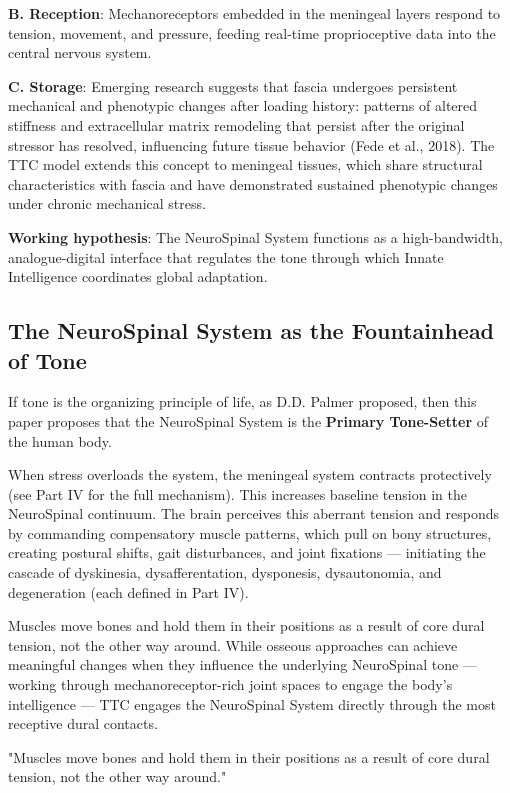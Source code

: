 \documentclass[11pt,letterpaper]{article}
\begin{document}
\textbf{B. Reception}: Mechanoreceptors embedded in the meningeal layers respond to tension, movement, and pressure, feeding real-time proprioceptive data into the central nervous system.


\textbf{C. Storage}: Emerging research suggests that fascia undergoes persistent mechanical and phenotypic changes after loading history: patterns of altered stiffness and extracellular matrix remodeling that persist after the original stressor has resolved, influencing future tissue behavior (Fede et al., 2018). The TTC model extends this concept to meningeal tissues, which share structural characteristics with fascia and have demonstrated sustained phenotypic changes under chronic mechanical stress.


\textbf{Working hypothesis}: The NeuroSpinal System functions as a high-bandwidth, analogue-digital interface that regulates the tone through which Innate Intelligence coordinates global adaptation.


\subsection{The NeuroSpinal System as the Fountainhead of Tone}

If tone is the organizing principle of life, as D.D. Palmer proposed, then this paper proposes that the NeuroSpinal System is the \textbf{Primary Tone-Setter} of the human body.


When stress overloads the system, the meningeal system contracts protectively (see Part IV for the full mechanism). This increases baseline tension in the NeuroSpinal continuum. The brain perceives this aberrant tension and responds by commanding compensatory muscle patterns, which pull on bony structures, creating postural shifts, gait disturbances, and joint fixations — initiating the cascade of dyskinesia, dysafferentation, dysponesis, dysautonomia, and degeneration (each defined in Part IV).


Muscles move bones and hold them in their positions as a result of core dural tension, not the other way around. While osseous approaches can achieve meaningful changes when they influence the underlying NeuroSpinal tone — working through mechanoreceptor-rich joint spaces to engage the body's intelligence — TTC engages the NeuroSpinal System directly through the most receptive dural contacts.


\begin{pullquotebox}
"Muscles move bones and hold them in their positions as a result of core dural tension, not the other way around."
\end{pullquotebox}
\end{document}
